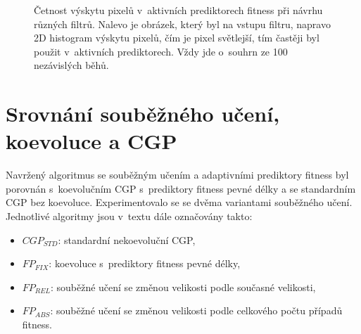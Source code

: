 \begin{figure}[p]
    \baselineskip

    \caption{Četnost výskytu pixelů v~aktivních prediktorech fitness při návrhu různých filtrů. Nalevo je obrázek, který byl na vstupu filtru, napravo 2D histogram výskytu pixelů, čím je pixel světlejší, tím častěji byl použit v~aktivních prediktorech. Vždy jde o~souhrn ze 100 nezávislých běhů.}
    \label{obrPredhist}
\end{figure}

\section{Srovnání souběžného učení, koevoluce a CGP}
\label{secExpComparison}

Navržený algoritmus se souběžným učením a adaptivními prediktory fitness byl porovnán s~koevolučním CGP s~prediktory fitness pevné délky a se standardním CGP bez koevoluce. Experimentovalo se se dvěma variantami souběžného učení. Jednotlivé algoritmy jsou v~textu dále označovány takto:

\begin{itemize}
    \item $\mathit{CGP_{STD}}$: standardní nekoevoluční CGP,
    \item $\mathit{FP_{FIX}}$: koevoluce s~prediktory fitness pevné délky,
    \item $\mathit{FP_{REL}}$: souběžné učení se změnou velikosti podle současné velikosti,
    \item $\mathit{FP_{ABS}}$: souběžné učení se změnou velikosti podle celkového počtu případů fitness.
\end{itemize}

